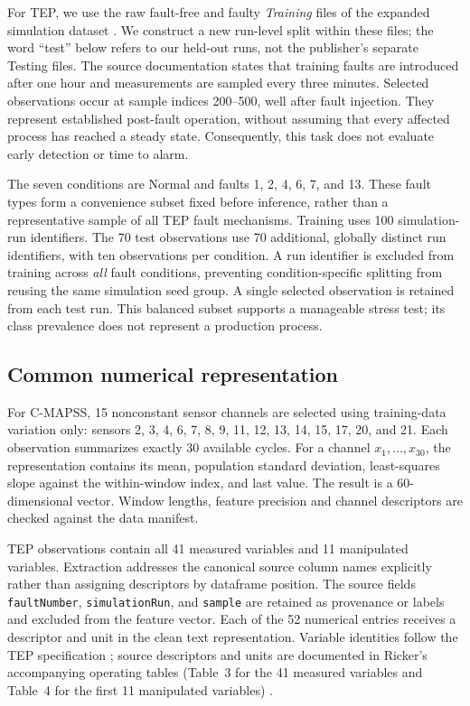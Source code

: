 \documentclass[11pt,a4paper]{article}
\begin{document}
For TEP, we use the raw fault-free and faulty \emph{Training} files of the expanded simulation dataset \citep{downs1993plant,rieth2017additional}. We construct a new run-level split within these files; the word ``test'' below refers to our held-out runs, not the publisher's separate Testing files. The source documentation states that training faults are introduced after one hour and measurements are sampled every three minutes. Selected observations occur at sample indices 200--500, well after fault injection. They represent established post-fault operation, without assuming that every affected process has reached a steady state. Consequently, this task does not evaluate early detection or time to alarm.

The seven conditions are Normal and faults 1, 2, 4, 6, 7, and 13. These fault types form a convenience subset fixed before inference, rather than a representative sample of all TEP fault mechanisms. Training uses 100 simulation-run identifiers. The 70 test observations use 70 additional, globally distinct run identifiers, with ten observations per condition. A run identifier is excluded from training across \emph{all} fault conditions, preventing condition-specific splitting from reusing the same simulation seed group. A single selected observation is retained from each test run. This balanced subset supports a manageable stress test; its class prevalence does not represent a production process.

\subsection{Common numerical representation}
For C-MAPSS, 15 nonconstant sensor channels are selected using training-data variation only: sensors 2, 3, 4, 6, 7, 8, 9, 11, 12, 13, 14, 15, 17, 20, and 21. Each observation summarizes exactly 30 available cycles. For a channel $x_1,\ldots,x_{30}$, the representation contains its mean, population standard deviation, least-squares slope against the within-window index, and last value. The result is a 60-dimensional vector. Window lengths, feature precision and channel descriptors are checked against the data manifest.

TEP observations contain all 41 measured variables and 11 manipulated variables. Extraction addresses the canonical source column names explicitly rather than assigning descriptors by dataframe position. The source fields \texttt{faultNumber}, \texttt{simulationRun}, and \texttt{sample} are retained as provenance or labels and excluded from the feature vector. Each of the 52 numerical entries receives a descriptor and unit in the clean text representation. Variable identities follow the TEP specification \citep{chen2014cognitive}; source descriptors and units are documented in Ricker's accompanying operating tables (Table~3 for the 41 measured variables and Table~4 for the first 11 manipulated variables) \citep{ricker1995optimal}.
\end{document}
